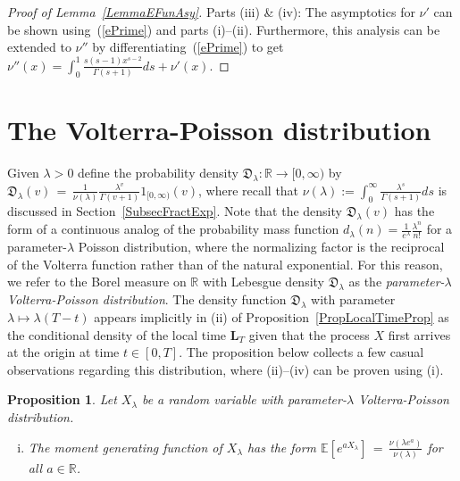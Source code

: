 \documentclass[10pt]{article}
\numberwithin{equation}{section}
\newtheorem{proposition}[theorem]{Proposition}
\theoremstyle{definition}
\newcommand{\R}{{\mathbb R}}
\begin{document}
\begin{appendix}
\begin{proof}[Proof of Lemma~\ref{LemmaEFunAsy}]
\noindent Parts (iii) \& (iv):  The asymptotics for $\nu'$ can be shown using~(\ref{ePrime}) and parts (i)--(ii). Furthermore, this analysis can be extended to $\nu''$ by differentiating~(\ref{ePrime}) to get
$\nu''(x)=\int_0^1 \frac{ s(s-1)x^{s-2} }{\Gamma(s+1)} ds +\nu'(x)  $.
\end{proof}






  \section{The Volterra-Poisson distribution }\label{AppendixSectPoisson}
Given $\lambda>0$ define the probability density $\mathfrak{D}_{\lambda}:\R\rightarrow [0,\infty)$ by
$     \mathfrak{D}_{\lambda}(v)\,=\,\frac{1}{\nu(\lambda)}\frac{  \lambda^v }{\Gamma(v+1)  } 1_{[0,\infty)}(v)   $,
where recall that $\nu(\lambda):=\int_0^{\infty}\frac{\lambda^s}{\Gamma(s+1)}ds$ is  discussed in Section~\ref{SubsecFractExp}.  Note that the density $\mathfrak{D}_{\lambda}(v)$ has the form of a continuous analog of the probability mass function $d_{\lambda}(n)=\frac{1}{e^{\lambda}}\frac{\lambda^n}{n!}$ for a parameter-$\lambda$ Poisson distribution, where the normalizing factor is the reciprocal of the Volterra function rather than of the natural exponential. For this reason, we refer to the Borel measure on $\R$ with Lebesgue density $\mathfrak{D}_{\lambda}$ as the  \textit{parameter-$\lambda$  Volterra-Poisson distribution}. The density function $\mathfrak{D}_{\lambda}$ with parameter $\lambda \mapsto \lambda (T-t)$ appears implicitly in (ii) of Proposition~\ref{PropLocalTimeProp} as the conditional density of the local time $\mathbf{L}_T$ given that the process $X$ first arrives at the origin at time $t\in [0,T]$. The proposition below collects a few casual observations regarding this distribution, where (ii)--(iv) can be proven using (i).
\begin{proposition}\label{PropVolterraPoisson} Let $X_{\lambda}$ be a random variable with parameter-$\lambda$  Volterra-Poisson distribution.
\begin{enumerate}[(i)]
    \item The moment generating function of $X_{\lambda}$ has the form
$  \mathbb{E}[  e^{a X_{\lambda} } ]\,=\,\frac{\nu(\lambda e^a) }{ \nu(\lambda)  } $ for all $a\in \R$.
    



\end{enumerate}
\end{proposition}
\end{appendix}
\end{document}
